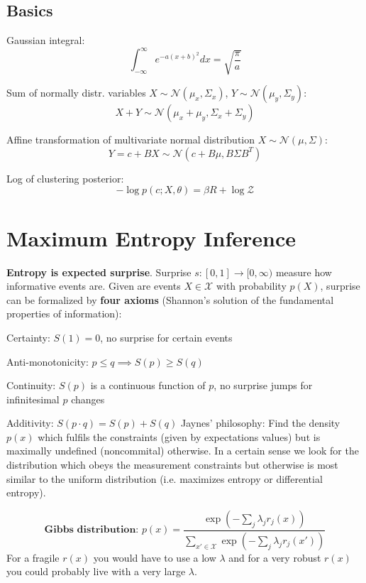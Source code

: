 \documentclass[12pt]{article}
\begin{document}
\subsection{Basics}
\ulb
\item Gaussian integral:
\[ \int_{-\infty}^{\infty} e^{-a(x+b)^2} dx = \sqrt{\frac{\pi}{a}} \]
\item Sum of normally distr. variables $X\sim\mathcal{N}(\mu_x,\Sigma_x)$, $Y\sim\mathcal{N}(\mu_y,\Sigma_y)$:
\[ X + Y \sim\mathcal{N}(\mu_x+\mu_y,\Sigma_x+\Sigma_y) \]
\item Affine transformation of multivariate normal distribution $X\sim\mathcal{N}(\mu,\Sigma)$:
\[ Y = c + BX \sim \mathcal{N}(c+B\mu, B\Sigma B^T) \]
\item Log of clustering posterior:
\[ -\log p(c;X,\theta) = \beta R + \log \mathcal{Z} \]
\ule

\section{Maximum Entropy Inference}
\textbf{Entropy is expected surprise}. Surprise $s : [0, 1] \rightarrow [0, \infty)$ measure how informative events are. Given are events $X \in \mathcal{X}$ with probability $p(X)$, surprise can be formalized by \textbf{four axioms} (Shannon's solution of the fundamental properties of information):
\ulb
\item Certainty: $S(1) = 0$, no surprise for certain events
\item Anti-monotonicity: $p \leq q \implies S(p) \geq S(q)$
\item Continuity: $S(p)$ is a continuous function of $p$, no surprise jumps for infinitesimal $p$ changes
\item Additivity: $S(p\cdot q) = S(p) + S(q)$
\ule
Jaynes' philosophy: Find the density $p(x)$ which fulfils the constraints (given by expectations values) but is maximally undefined (noncommital) otherwise. In a certain sense we look for the distribution which obeys the measurement constraints but otherwise is most similar to the uniform distribution (i.e. maximizes entropy or differential entropy).

\[ \textbf{Gibbs distribution: } p(x) = \frac{\exp(-\sum_j \lambda_j r_j(x))}{\sum_{x' \in \mathcal{X}}\exp(-\sum_j \lambda_j r_j(x'))} \]
For a fragile $r(x)$ you would have to use a low $\lambda$ and for a very robust $r(x)$ you could probably live with a very large $\lambda$.
\end{document}
